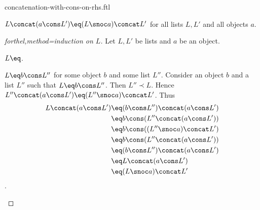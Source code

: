 \documentclass{naproche-library}
\begin{document}
\begin{smodule}[title=Concatenation with Cons on the Right-Hand Side]{concatenation-with-cons-on-rhs.ftl}

\begin{proposition}[forthel,id=RightConcatConsProp]
  $L \concat (a \cons L') \eq (L \snoc a) \concat L'$ for all lists $L,L'$ and all objects $a$.
\end{proposition}
\begin{proof}[forthel,method=induction on $L$]
  Let $L,L'$ be lists and $a$ be an object.

  \begin{case}{$L \eq \list{}$.} \end{case}

  \begin{case}{$L \eq b \cons L''$ for some object $b$ and some list $L''$.}
    Consider an object $b$ and a list $L''$ such that $L \eq b \cons L''$.
    Then $L'' \prec L$.
    Hence $L'' \concat (a \cons L') \eq (L'' \snoc a) \concat L'$.
    Thus
    \begin{align*}
      L \concat (a \cons L')
        &\eq (b \cons L'') \concat (a \cons L')\\
        &\eq b \cons (L'' \concat (a \cons L'))\\
        &\eq b \cons ((L'' \snoc a) \concat L')\\
        &\eq b \cons (L'' \concat (a \cons L'))\\
        &\eq (b \cons L'') \concat (a \cons L')\\
        &\eq L \concat (a \cons L')\\
        &\eq (L \snoc a) \concat L'
    \end{align*}.
  \end{case}
\end{proof}
\end{smodule}
\end{document}
